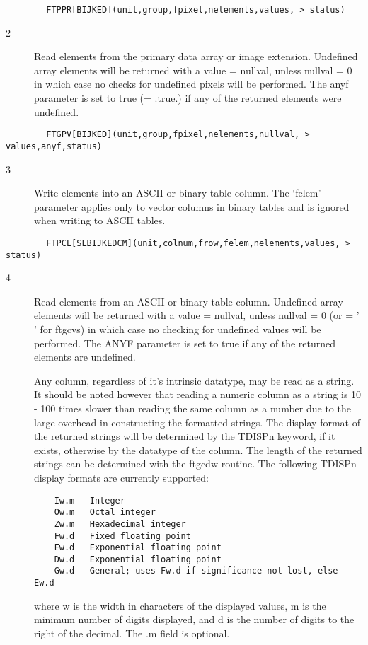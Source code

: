 \documentclass[11pt]{book}
\begin{document}
\begin{verbatim}
        FTPPR[BIJKED](unit,group,fpixel,nelements,values, > status)
\end{verbatim}

\begin{description}
\item[2 ] Read elements from the primary data array or image extension.
    Undefined array elements will be
    returned with a value = nullval, unless nullval = 0 in which case no
    checks for undefined pixels will be performed. The anyf parameter is
    set to true (= .true.) if any of the returned
   elements were undefined.
\end{description}

\begin{verbatim}
        FTGPV[BIJKED](unit,group,fpixel,nelements,nullval, > values,anyf,status)
\end{verbatim}

\begin{description}
\item[3 ] Write elements into an ASCII or binary table column. The `felem'
    parameter applies only to vector columns in binary tables and is
   ignored when writing to ASCII tables.
\end{description}

\begin{verbatim}
        FTPCL[SLBIJKEDCM](unit,colnum,frow,felem,nelements,values, > status)
\end{verbatim}

\begin{description}
\item[4 ] Read elements from an ASCII or binary table column.  Undefined
    array elements will be returned with a value = nullval, unless nullval = 0
    (or = ' ' for ftgcvs) in which case no checking for undefined values will
    be performed. The ANYF parameter is set to true if any of the returned
    elements are undefined.

    Any column, regardless of it's intrinsic datatype, may be read as a
    string.  It should be noted however that reading a numeric column
    as a string is 10 - 100 times slower than reading the same column
    as a number due to the large overhead in constructing the formatted
    strings.  The display format of the returned strings will be
    determined by the TDISPn keyword, if it exists, otherwise by the
    datatype of the column.  The length of the returned strings  can be
    determined with the ftgcdw routine.  The following TDISPn display
    formats are currently supported:

\begin{verbatim}
    Iw.m   Integer
    Ow.m   Octal integer
    Zw.m   Hexadecimal integer
    Fw.d   Fixed floating point
    Ew.d   Exponential floating point
    Dw.d   Exponential floating point
    Gw.d   General; uses Fw.d if significance not lost, else Ew.d
\end{verbatim}
  where w is the width in characters of the displayed values, m is the minimum
  number of digits displayed, and d is the number of digits to the right of the
  decimal.  The .m field is optional.
\end{description}
\end{document}
